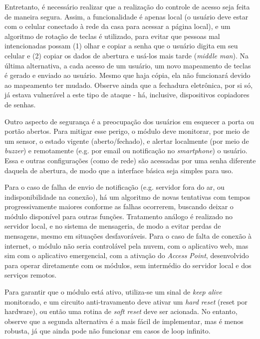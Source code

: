 Entretanto, é necessário realizar que a realização do controle de acesso seja feita de maneira segura. Assim, a funcionalidade é apenas local (o usuário deve estar com o celular conectado à rede da casa para acessar a página local), e um algoritmo de rotação de teclas é utilizado, para evitar que pessoas mal intencionadas possam (1) olhar e copiar a senha que o usuário digita em seu celular e (2) copiar os dados de abertura e usá-los mais tarde (\textit{middle man}). Na última alternativa, a cada acesso de um usuário, um novo mapeamento de teclas é gerado e enviado ao usuário. Mesmo que haja cópia, ela não funcionará devido ao mapeamento ter mudado. Observe ainda que a fechadura eletrônica, por si só, já estava vulnerável a este tipo de ataque - há, inclusive, dispositivos copiadores de senhas.

Outro aspecto de segurança é a preocupação dos usuários em esquecer a porta ou portão abertos. Para mitigar esse perigo, o módulo deve monitorar, por meio de um sensor, o estado vigente (aberto/fechado), e alertar localmente (por meio de \textit{buzzer}) e remotamente (e.g. por email ou notificação no \textit{smartphone}) o usuário. Essa e outras configurações (como de rede) são acessadas por uma senha diferente daquela de abertura, de modo que a interface básica seja simples para uso.

Para o caso de falha de envio de notificação (e.g. servidor fora do ar, ou indisponibilidade na conexão), há um algoritmo de novas tentativas com tempos progressivamente maiores conforme as falhas ocorrerem, buscando deixar o módulo disponível para outras funções. Tratamento análogo é realizado no servidor local, e no sistema de mensageria, de modo a evitar perdas de mensagens, mesmo em situações desfavoráveis. Para o caso de falta de conexão à internet, o módulo não seria controlável pela nuvem, com o aplicativo web, mas sim com o aplicativo emergencial, com a ativação do \textit{Access Point}, desenvolvido para operar diretamente com os módulos, sem intermédio do servidor local e dos serviços remotos.

Para garantir que o módulo está ativo, utiliza-se um sinal de \textit{keep alive} monitorado, e um circuito anti-travamento deve ativar um \textit{hard reset} (reset por hardware), ou então uma rotina de \textit{soft reset} deve ser acionada. No entanto, observe que a segunda alternativa é a mais fácil de implementar, mas é menos robusta, já que ainda pode não funcionar em casos de loop infinito.

